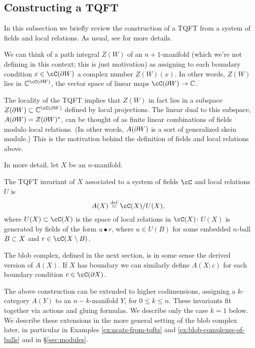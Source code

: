 \subsection{Constructing a TQFT}
\label{sec:constructing-a-tqft}

In this subsection we briefly review the construction of a TQFT from a system of fields and local relations.
As usual, see \cite{kw:tqft} for more details.

We can think of a path integral $Z(W)$ of an $n+1$-manifold 
(which we're not defining in this context; this is just motivation) as assigning to each
boundary condition $x\in \cC(\bd W)$ a complex number $Z(W)(x)$.
In other words, $Z(W)$ lies in $\c^{\lf(\bd W)}$, the vector space of linear
maps $\lf(\bd W)\to \c$.

The locality of the TQFT implies that $Z(W)$ in fact lies in a subspace
$Z(\bd W) \sub \c^{\lf(\bd W)}$ defined by local projections.
The linear dual to this subspace, $A(\partial W) = Z(\partial W)^*$,
can be thought of as finite linear combinations of fields modulo local relations.
(In other words, $A(\partial W)$ is a sort of generalized skein module.)
This is the motivation behind the definition of fields and local relations above.

In more detail, let $X$ be an $n$-manifold.
\begin{defn}
\label{defn:TQFT-invariant}
The TQFT invariant of $X$ associated to a system of fields $\cC$ and local relations $U$ is 
	$$A(X) \deq \lf(X) / U(X),$$
where $U(X) \sub \lf(X)$ is the space of local relations in $\lf(X)$:
$U(X)$ is generated by fields of the form $u\bullet r$, where
$u\in U(B)$ for some embedded $n$-ball $B\subset X$ and $r\in \cC(X\setmin B)$.
\end{defn}
The blob complex, defined in the next section, 
is in some sense the derived version of $A(X)$.
If $X$ has boundary we can similarly define $A(X; c)$ for each 
boundary condition $c\in\cC(\bd X)$.

The above construction can be extended to higher codimensions, assigning
a $k$-category $A(Y)$ to an $n{-}k$-manifold $Y$, for $0 \le k \le n$.
These invariants fit together via actions and gluing formulas.
We describe only the case $k=1$ below. We describe these extensions in the more general setting of the blob complex later, in particular in Examples \ref{ex:ncats-from-tqfts} and \ref{ex:blob-complexes-of-balls} and  in \S \ref{sec:modules}.

